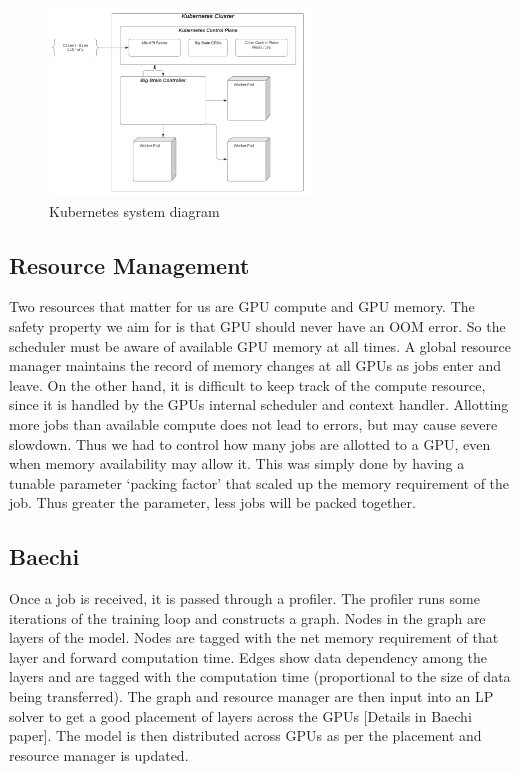 \label{fig:architecure}
\begin{figure}[htbp]
\centerline{\includegraphics[height=5cm]{figures/architecure.png}}
\caption{Kubernetes system diagram}
\end{figure}

\subsection{Resource Management}

Two resources that matter for us are GPU compute and GPU memory. The safety
property we aim for is that GPU should never have an OOM error. So the scheduler
must be aware of available GPU memory at all times. A global resource manager
maintains the record of memory changes at all GPUs as jobs enter and leave. On
the other hand, it is difficult to keep track of the compute resource, since it
is handled by the GPUs internal scheduler and context handler. Allotting more
jobs than available compute does not lead to errors, but may cause severe
slowdown. Thus we had to control how many jobs are allotted to a GPU, even when
memory availability may allow it. This was simply done by having a tunable
parameter `packing factor' that scaled up the memory requirement of the job.
Thus greater the parameter, less jobs will be packed together. 

\subsection{Baechi}

Once a job is received, it is passed through a profiler. The profiler runs some
iterations of the training loop and constructs a graph. Nodes in the graph are
layers of the model. Nodes are tagged with the net memory requirement of that
layer and forward computation time. Edges show data dependency among the layers
and are tagged with the computation time (proportional to the size of data being
transferred). The graph and resource manager are then input into an LP solver to
get a good placement of layers across the GPUs [Details in Baechi paper]. The
model is then distributed across GPUs as per the placement and resource manager
is updated.

